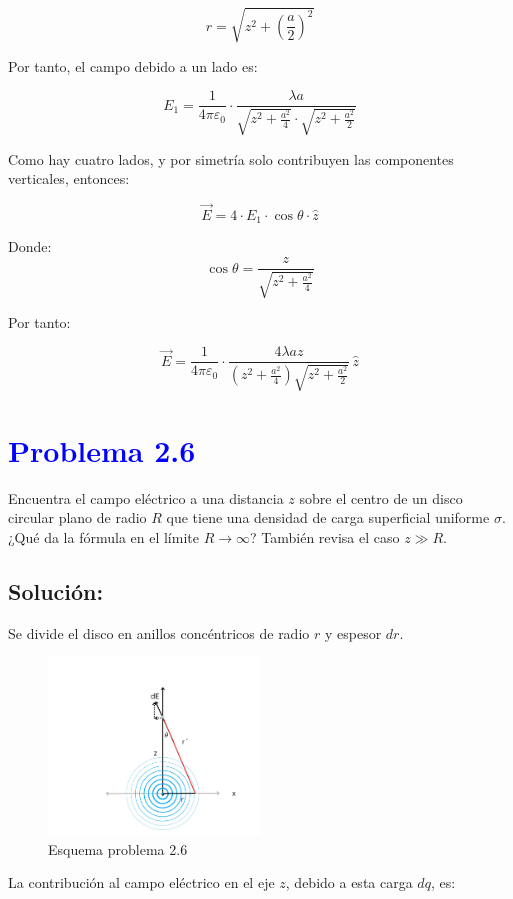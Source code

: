 \documentclass[12pt]{article}
\newcommand{\question}[1]{\textcolor{blue}{\textbf{#1}}}
\begin{document}
\[
r = \sqrt{z^2 + \left(\frac{a}{2}\right)^2}
\]

Por tanto, el campo debido a un lado es:

\[
E_1 = \frac{1}{4\pi\varepsilon_0} \cdot \frac{\lambda a}{\sqrt{z^2 + \frac{a^2}{4}} \cdot \sqrt{z^2 + \frac{a^2}{2}}}
\]

Como hay cuatro lados, y por simetría solo contribuyen las componentes verticales, entonces:

\[
\vec{E} = 4 \cdot E_1 \cdot \cos\theta \cdot \hat{z}
\]

Donde: 
\[
\cos\theta = \frac{z}{\sqrt{z^2 + \frac{a^2}{4}}}
\]

Por tanto:


\[
\boxed{
\vec{E} = \frac{1}{4\pi\varepsilon_0} \cdot \frac{4\lambda a z}{\left(z^2 + \frac{a^2}{4}\right) \sqrt{z^2 + \frac{a^2}{2}}} \, \hat{z}
}
\]

\section*{\question{Problema 2.6} }Encuentra el campo eléctrico a una distancia \( z \) sobre el centro de un disco circular plano de radio \( R \) que tiene una densidad de carga superficial uniforme \( \sigma \). ¿Qué da la fórmula en el límite \( R \to \infty \)? También revisa el caso \( z \gg R \).

\subsection*{Solución:}
Se divide el disco en anillos concéntricos de radio \( r \) y espesor \( dr \). 

\begin{figure}[ht] 
    \centering
    \includegraphics[width=0.5\textwidth]{imagenes/eje2.6.jpg} 
    \caption{Esquema problema 2.6}
    \label{Esquema3}
\end{figure}


La contribución al campo eléctrico en el eje \( z \), debido a esta carga \( dq \), es:
\end{document}
